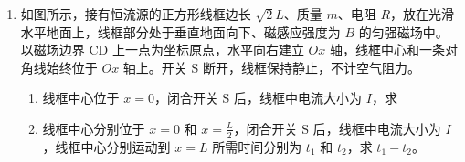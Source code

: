 \documentclass[\gkver]{gaokaozhenti}
\begin{document}
\begin{enumerate}
{联立解得 $h_{1} = 2.5 \Um$

若经一次反弹落入洞中，则

$t_{2} = \frac{2v_{F}'\sin37^{\circ}}{g} + \frac{v_{F}'\sin37^{\circ}}{g}$

水平方向

$L_{FG} + L_{GH} + L_{HI} = v_{F}'\cos37^{\circ}t_{2}$

结合

$mgh_{2} = \frac{1}{2}mv_{0}'''^{2}$，$mv_{0}''' = 2mv_{C}'''$

$-2mgL\sin37^{\circ} - \mu \cdot 2mg\cos37^{\circ}L = \frac{1}{2} \times 2mv_{F}'^{2} - \frac{1}{2} \times 2mv_{C}'''^{2}$

联立解得 $h_{2} = 2 \Um$
}

\item
如图所示，接有恒流源的正方形线框边长 $\sqrt{2}L$、质量 $m$、电阻 $R$，放在光滑水平地面上，线框部分处于垂直地面向下、磁感应强度为 $B$ 的匀强磁场中。以磁场边界 CD 上一点为坐标原点，水平向右建立 $Ox$ 轴，线框中心和一条对角线始终位于 $Ox$ 轴上。开关 S 断开，线框保持静止，不计空气阻力。

\begin{enumerate}
\item
线框中心位于 $x = 0$，闭合开关 S 后，线框中电流大小为 $I$，求


\item
线框中心分别位于 $x = 0$ 和 $x = \frac{L}{2}$，闭合开关 S 后，线框中电流大小为 $I$，线框中心分别运动到 $x = L$ 所需时间分别为 $t_{1}$ 和 $t_{2}$，求 $t_{1} - t_{2}$。
\end{enumerate}


\end{enumerate}
\end{document}
